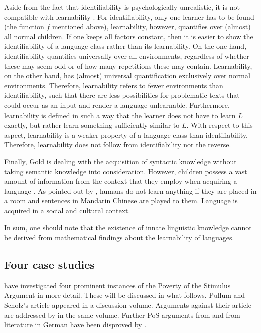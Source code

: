 Aside from the fact that identifiability is psychologically unrealistic, it is not compatible with learnability \citep[]{Johnson2004a}.
For identifiability, only one learner has to be found (the function $f$ mentioned above), learnability, however, quantifies over
(almost) all normal children. If one keeps all factors constant, then it is easier to show the identifiability of a language class rather than
its learnability.
On the one hand, identifiability quantifies universally over all environments, regardless of whether these may seem odd or of how many repetitions these may contain.
Learnability, on the other hand, has (almost) universal quantification exclusively over normal environments. Therefore, learnability refers to fewer environments
than identifiability, such that there are less possibilities for problematic texts that could occur as an input and render a language unlearnable.
Furthermore, learnability is defined in such a way that the learner does not have to learn $L$ exactly, but rather learn something sufficiently similar
to $L$. With respect to this aspect, learnability is a weaker property of a language class than
identifiability. Therefore, learnability does not follow from identifiability nor the reverse.
  
Finally, Gold is dealing with the acquisition of syntactic knowledge without taking semantic knowledge into consideration.  
However, children possess a vast amount of information from the context that they employ when acquiring a language \citep{TCCBM2005a}.
As pointed out by \citet[]{Klein86a-u}, humans do not learn anything if they are placed in a room and sentences in
Mandarin Chinese are played to them. Language is acquired in a social and cultural context.
  
In sum, one should note that the existence of innate linguistic knowledge cannot be derived from mathematical
findings about the learnability of languages.  

\subsection{Four case studies}
\label{PSA-cases}

\mbox{}\citet{PS2002a} have investigated four prominent instances of the Poverty of the Stimulus Argument in more detail.
These will be discussed in what follows. Pullum and Scholz's article appeared in a discussion volume. Arguments against their
article are addressed by \citet{SP2002b} in the same volume. Further PoS arguments from \citet{Chomsky86a} and
from literature in German have been disproved by \citet{Eisenberg92b}.

